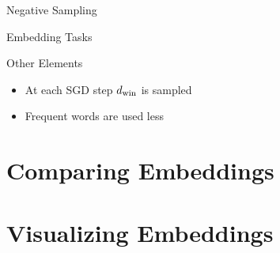 \documentclass{beamer}
\begin{document}

\begin{frame}{Negative Sampling}

\end{frame}

\begin{frame}{Embedding Tasks}

\end{frame}

\begin{frame}{Other Elements}
  \begin{itemize}
  \item At each SGD step ${d_{\mathrm{win}}}$ is sampled

  \item Frequent words are used less
  \end{itemize}
\end{frame}

\section{Comparing Embeddings}

\begin{frame}

\end{frame}

\section{Visualizing Embeddings}

\begin{frame}

\end{frame}


\begin{frame}

\end{frame}
\end{document}

